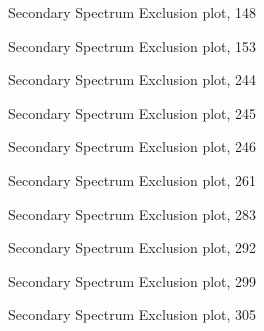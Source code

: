 \documentclass{emulateapj}
\begin{document}
\begin{figure}
\caption{Secondary Spectrum Exclusion plot, 148}
\label{fig:koi148_ssep}
\end{figure}

\begin{figure}
\caption{Secondary Spectrum Exclusion plot, 153}
\label{fig:koi153_ssep}
\end{figure}

\begin{figure}
\caption{Secondary Spectrum Exclusion plot, 244}
\label{fig:koi244_ssep}
\end{figure}

\begin{figure}
\caption{Secondary Spectrum Exclusion plot, 245}
\label{fig:koi245_ssep}
\end{figure}

\begin{figure}
\caption{Secondary Spectrum Exclusion plot, 246}
\label{fig:koi246_ssep}
\end{figure}

\begin{figure}
\caption{Secondary Spectrum Exclusion plot, 261}
\label{fig:koi261_ssep}
\end{figure}

\begin{figure}
\caption{Secondary Spectrum Exclusion plot, 283}
\label{fig:koi283_ssep}
\end{figure}

\begin{figure}
\caption{Secondary Spectrum Exclusion plot, 292}
\label{fig:koi292_ssep}
\end{figure}


\begin{figure}
\caption{Secondary Spectrum Exclusion plot, 299}
\label{fig:koi299_ssep}
\end{figure}

\begin{figure}
\caption{Secondary Spectrum Exclusion plot, 305}
\label{fig:koi305_ssep}
\end{figure}
\clearpage  %
\end{document}
